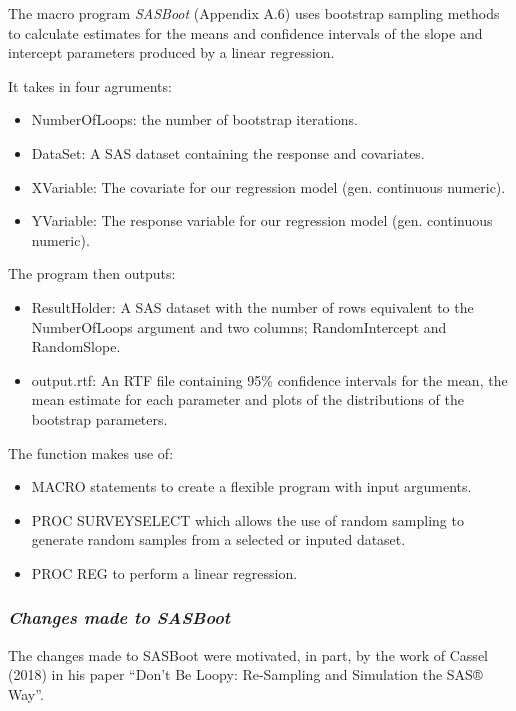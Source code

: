 \documentclass[]{article}
\providecommand{\tightlist}{%
  \setlength{\itemsep}{0pt}\setlength{\parskip}{0pt}}
\begin{document}
The macro program \emph{SASBoot} (Appendix A.6) uses bootstrap sampling
methods to calculate estimates for the means and confidence intervals of
the slope and intercept parameters produced by a linear regression.

It takes in four agruments:

\begin{itemize}
\tightlist
\item
  NumberOfLoops: the number of bootstrap iterations.
\item
  DataSet: A SAS dataset containing the response and covariates.
\item
  XVariable: The covariate for our regression model (gen. continuous
  numeric).
\item
  YVariable: The response variable for our regression model (gen.
  continuous numeric).
\end{itemize}

The program then outputs:

\begin{itemize}
\tightlist
\item
  ResultHolder: A SAS dataset with the number of rows equivalent to the
  NumberOfLoops argument and two columns; RandomIntercept and
  RandomSlope.
\item
  output.rtf: An RTF file containing 95\% confidence intervals for the
  mean, the mean estimate for each parameter and plots of the
  distributions of the bootstrap parameters.
\end{itemize}

The function makes use of:

\begin{itemize}
\tightlist
\item
  MACRO statements to create a flexible program with input arguments.
\item
  PROC SURVEYSELECT which allows the use of random sampling to generate
  random samples from a selected or inputed dataset.
\item
  PROC REG to perform a linear regression.
\end{itemize}

\subsubsection{\texorpdfstring{\emph{Changes made to
SASBoot}}{Changes made to SASBoot}}\label{changes-made-to-sasboot}

The changes made to SASBoot were motivated, in part, by the work of
Cassel (2018) in his paper ``Don't Be Loopy: Re-Sampling and Simulation
the SAS® Way''.
\end{document}
